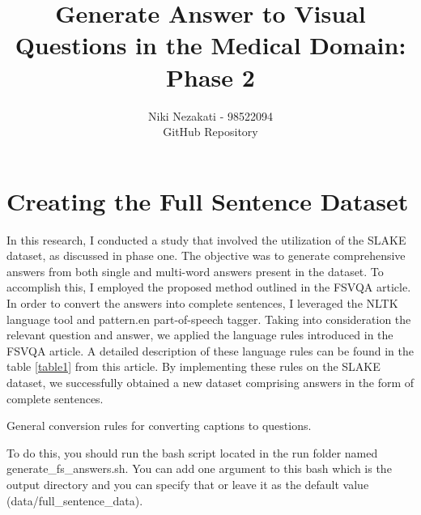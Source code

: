 \documentclass{adonis}
\title{Generate Answer to Visual Questions in the Medical Domain: Phase 2}
\author{Niki Nezakati - 98522094
\\
\href{https://github.com/nikinezakati/medical-gen-vqa/tree/phase-two}{\faicon{github}} GitHub Repository}
\begin{document}
	\maketitle
	\section{Creating the Full Sentence Dataset}
	
       In this research, I conducted a study that involved the utilization of the SLAKE \cite{slake} dataset, as discussed in phase one. The objective was to generate comprehensive answers from both single and multi-word answers present in the dataset. To accomplish this, I employed the proposed method outlined in the FSVQA \cite{FSVQA} article. In order to convert the answers into complete sentences, I leveraged the NLTK language tool and pattern.en part-of-speech tagger. Taking into consideration the relevant question and answer, we applied the language rules introduced in the FSVQA article. A detailed description of these language rules can be found in the table \ref{table1} from this article. By implementing these rules on the SLAKE dataset, we successfully obtained a new dataset comprising answers in the form of complete sentences.
       

       \begin{table}[h]
        \caption{General conversion rules for converting captions to questions.}
    \label{table1}
\end{table}

To do this, you should run the bash script located in the run folder named generate\_fs\_answers.sh. You can add one argument to this bash which is the output directory and you can specify that or leave it as the default value (data/full\_sentence\_data).
\end{document}
